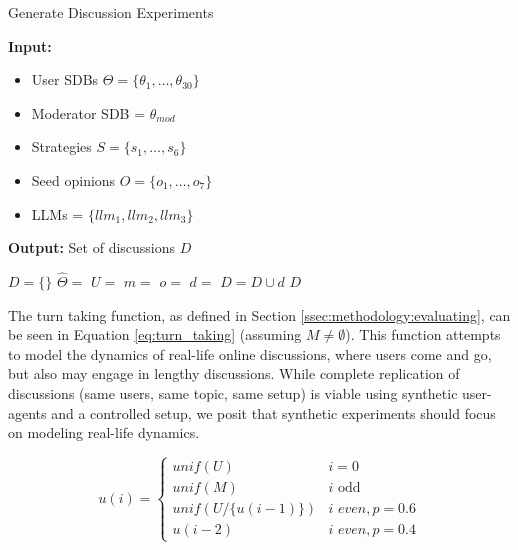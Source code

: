 \begin{algorithm}


\caption{Generate Discussion Experiments}
\label{alg:exp_generation}
\hspace*{\algorithmicindent} \textbf{Input:} 
         \begin{itemize}[noitemsep, nosep]
             \item User \acp{SDB} $\Theta = \{\theta_1, \dots, \theta_{30}\}$
             \item Moderator SDB = $\theta_{mod}$
             \item Strategies $S = \{s_1, \ldots, s_6\}$
             \item Seed opinions $O = \{o_1, \ldots, o_7\}$
             \item LLMs = $\{llm_1, llm_2, llm_3\}$
         \end{itemize}
         \hspace*{\algorithmicindent} \textbf{Output:} Set of discussions $D$
\begin{algorithmic}[1]
    \State $D = \{\}$
                \State $\hat{\Theta} = $ 
                \State $U =$  
                \State $m = $ 
                \State $o = $ 
                \State $d =$ 
                \State $D = D \cup d$
            \EndFor
        \EndFor
    \EndFor
    \State \Return $D$
\end{algorithmic}
\end{algorithm}

The turn taking function, as defined in Section \ref{ssec:methodology:evaluating}, can be seen in Equation \ref{eq:turn_taking} (assuming $M \neq \emptyset$). This function attempts to model the dynamics of real-life online discussions, where users come and go, but also may engage in lengthy discussions. While complete replication of discussions (same users, same topic, same setup) is viable using synthetic user-agents and a controlled setup, we posit that synthetic experiments should focus on modeling real-life dynamics.

\small
\begin{equation}
\label{eq:turn_taking}
    u(i) = \left\{
\begin{array}{ll}
\textit{unif}(U) & i=0\\
    \textit{unif}(M) & i \text{ odd}\\
    \textit{unif}(U/\{u(i-1)\}) & i \textit{ even}, p=0.6 \\
    u(i-2) & i \textit{ even}, p=0.4 
\end{array} 
\right.
\end{equation}
\normalsize

